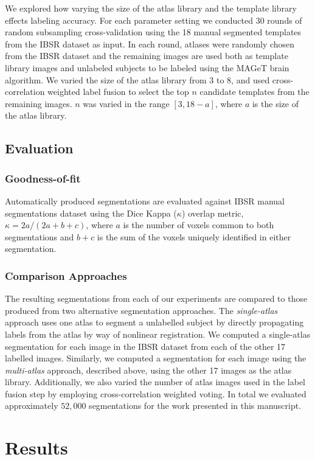 \documentclass{article}\usepackage{graphicx, color}
\begin{document}
We explored how varying the size of the atlas library and the template library
effects labeling accuracy.  For each parameter setting we conducted 30 rounds
of random subsampling cross-validation using the 18 manual segmented templates
from the IBSR dataset as input. In each round, atlases were randomly chosen
from the IBSR dataset and the remaining images are used both as template
library images and unlabeled subjects to be labeled using the MAGeT brain
algorithm.  We varied the size of the atlas library from 3 to 8, and used
cross-correlation weighted label fusion to select the top $n$ candidate
templates from the remaining images.  $n$ was varied in the range $[3, 18-a]$,
where $a$ is the size of the atlas library.

\subsection{Evaluation}
\subsubsection{Goodness-of-fit}
Automatically produced segmentations are evaluated against IBSR manual
segmentations dataset using the Dice Kappa ($\kappa$) overlap metric, $\kappa =
{2a}/{(2a+b+c)}$, where $a$ is the number of voxels common to both
segmentations and $b+c$ is the sum of the voxels uniquely identified in either
segmentation.

\subsubsection{Comparison Approaches}
The resulting segmentations from each of our experiments are compared to those
produced from two alternative segmentation approaches. The {\it single-atlas}
approach uses one atlas to segment a unlabelled subject by directly propagating
labels from the atlas by way of nonlinear registration.  We computed a
single-atlas segmentation for each image in the IBSR dataset from each of the
other 17 labelled images.  Similarly, we computed a segmentation for each image
using the {\it multi-atlas} approach, described above, using the other 17
images as the atlas library.  Additionally, we also varied the number of atlas
images used in the label fusion step by employing cross-correlation weighted
voting.  In total we evaluated approximately $52,000$ segmentations for the
work presented in this manuscript.

\section{Results}
\end{document}
